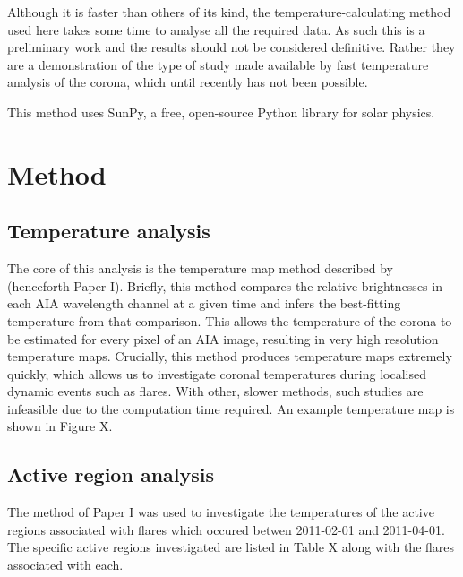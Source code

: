 \documentclass{article}
\begin{document}
Although it is faster than others of its kind, the temperature-calculating method used here takes some time to analyse all the required data.
As such this is a preliminary work and the results should not be considered definitive.
Rather they are a demonstration of the type of study made available by fast temperature analysis of the corona, which until recently has not been possible.

This method uses SunPy, a free, open-source Python library for solar physics.

\section{Method}
\subsection{Temperature analysis}
The core of this analysis is the temperature map method described by \cite{Leonard2014} (henceforth Paper I).
Briefly, this method compares the relative brightnesses in each AIA wavelength channel at a given time and infers the best-fitting temperature from that comparison.
This allows the temperature of the corona to be estimated for every pixel of an AIA image, resulting in very high resolution temperature maps.
Crucially, this method produces temperature maps extremely quickly, which allows us to investigate coronal temperatures during localised dynamic events such as flares.
With other, slower methods, such studies are infeasible due to the computation time required.
An example temperature map is shown in Figure X. %

\subsection{Active region analysis}
The method of Paper I was used to investigate the temperatures of the active regions associated with flares which occured betwen 2011-02-01 and 2011-04-01.
The specific active regions investigated are listed in Table X along with the flares associated with each. %

\begin{table}
	\centering
		\begin{tabular}
			
		\end{tabular}
	\caption{Times and associated active regions of solar flares studied}
	\label{tab:flares}
\end{table}
\end{document}
